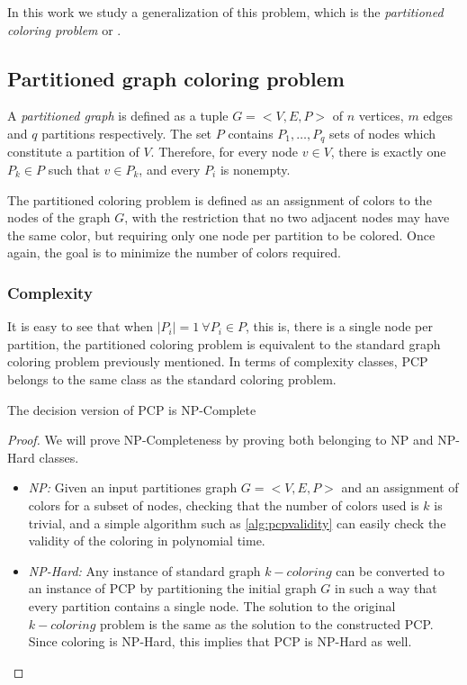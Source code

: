 In this work we study a generalization of this problem, which is the \textit{partitioned coloring problem} or \PCP.

\subsection{Partitioned graph coloring problem}

A \textit{partitioned graph} is defined as a tuple $G = <V,E,P>$ of $n$ vertices, $m$ edges and $q$ partitions respectively. The set $P$ contains $P_1, \ldots ,P_q$ sets of nodes which constitute a partition of $V$. Therefore, for every node $v \in V$, there is exactly one $P_k \in P$ such that $v \in P_k$, and every $P_i$ is nonempty.

The partitioned coloring problem is defined as an assignment of colors to the nodes of the graph $G$, with the restriction that no two adjacent nodes may have the same color, but requiring only one node per partition to be colored. Once again, the goal is to minimize the number of colors required.

\subsubsection*{Complexity}

It is easy to see that when $|P_i| = 1\ \forall P_i \in P$, this is, there is a single node per partition, the partitioned coloring problem is equivalent to the standard graph coloring problem previously mentioned. In terms of complexity classes, PCP belongs to the same class as the standard coloring problem.

\begin{theorem}
The decision version of PCP is NP-Complete
\end{theorem}

\begin{proof}
We will prove NP-Completeness by proving both belonging to NP and NP-Hard classes.

\begin{itemize}
\item{\textit{NP:} Given an input partitiones graph $G = <V,E,P>$ and an assignment of colors for a subset of nodes, checking that the number of colors used is $k$ is trivial, and a simple algorithm such as \ref{alg:pcpvalidity} can easily check the validity of the coloring in polynomial time.}
\item{\textit{NP-Hard:} Any instance of standard graph $k-coloring$ can be converted to an instance of PCP by partitioning the initial graph $G$ in such a way that every partition contains a single node. The solution to the original $k-coloring$ problem is the same as the solution to the constructed PCP. Since coloring is NP-Hard, this implies that PCP is NP-Hard as well.}
\end{itemize}

\end{proof}

